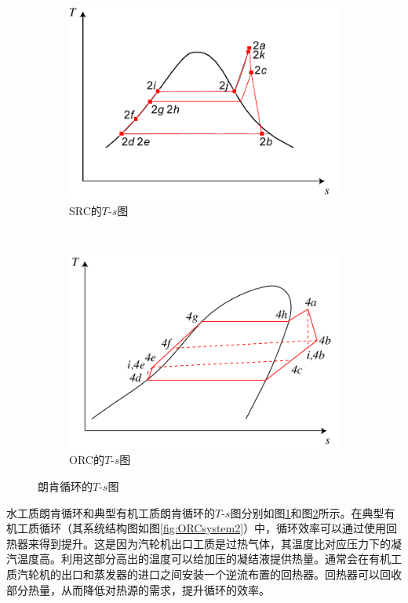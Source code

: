 \noindent \begin{figure}[htbp]
\centering
	\begin{subfigure}[b]{0.35\columnwidth}
	\includegraphics[width = \columnwidth]{fig/Ts_a.pdf}
	\caption{SRC的$T$-$s$图}\label{fig:Ts_Water}
	\end{subfigure}
	~
\begin{subfigure}[b]{0.35\columnwidth}
	\includegraphics[width = \columnwidth]{fig/Ts_b.pdf}
	\caption{ORC的$T$-$s$图}\label{fig:Ts_organic}
	\end{subfigure}
	\caption{朗肯循环的$T$-$s$图}
	\label{fig:Ts}
\end{figure}

水工质朗肯循环和典型有机工质朗肯循环的$T$-$s$图分别如图\ref{fig:Ts_Water}和图\ref{fig:Ts_organic}所示。在典型有机工质循环（其系统结构图如图\ref{fig:ORCsystem2}）中，循环效率可以通过使用回热器来得到提升。这是因为汽轮机出口工质是过热气体，其温度比对应压力下的凝汽温度高。利用这部分高出的温度可以给加压的凝结液提供热量。通常会在有机工质汽轮机的出口和蒸发器的进口之间安装一个逆流布置的回热器。回热器可以回收部分热量，从而降低对热源的需求，提升循环的效率。

